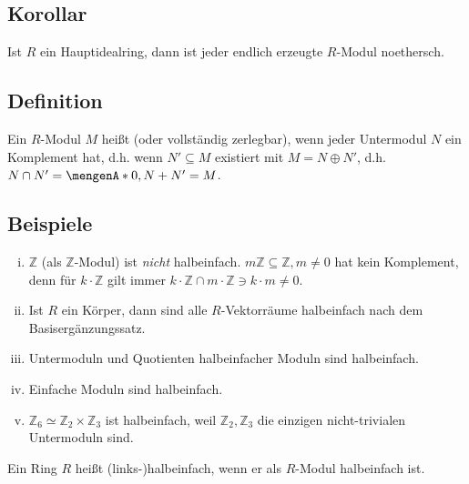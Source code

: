 \subsection[Korollar: Endlich erzeugte Moduln über einem Hauptidealring sind noethersch]{Korollar} %
\label{sub:216}
Ist $R$ ein Hauptidealring, dann ist jeder endlich erzeugte $R$-Modul noethersch.

\subsection[Definition: Halbeinfacher Modul]{Definition} %
\label{sub:217}
Ein $R$-Modul $M$ heißt  (oder vollständig zerlegbar), wenn jeder Untermodul $N$ ein Komplement hat, d.h. wenn $N' \subseteq M$ existiert mit $M = N \oplus N'$, d.h. $N \cap N' = \set{0}, N+ N' = M $.

\subsection[Beispiele zu halbeinfachen Moduln]{Beispiele} %
\label{sub:218}
\begin{enumerate}[(i)]
	\item $\mathds{Z}$ (als $\mathds{Z}$-Modul) ist \emph{nicht} halbeinfach. $m \mathds{Z} \subseteq \mathds{Z}, m \not= 0$ hat kein Komplement, denn für 
	$k \cdot \mathds{Z}$ gilt immer $k \cdot \mathds{Z} \cap m \cdot \mathds{Z} \ni k \cdot m \not= 0$.
	\item Ist $R$ ein Körper, dann sind alle $R$-Vektorräume halbeinfach nach dem Basisergänzungssatz.
	\item Untermoduln und Quotienten halbeinfacher Moduln sind halbeinfach.
	\item Einfache Moduln sind halbeinfach.
	\item $\mathds{Z}_6 \simeq \mathds{Z}_2 \times \mathds{Z}_3$ ist halbeinfach, weil $\mathds{Z}_2, \mathds{Z}_3$ die einzigen nicht-trivialen Untermoduln sind.
\end{enumerate}
Ein Ring $R$ heißt (links-)halbeinfach, wenn er als $R$-Modul halbeinfach ist.

